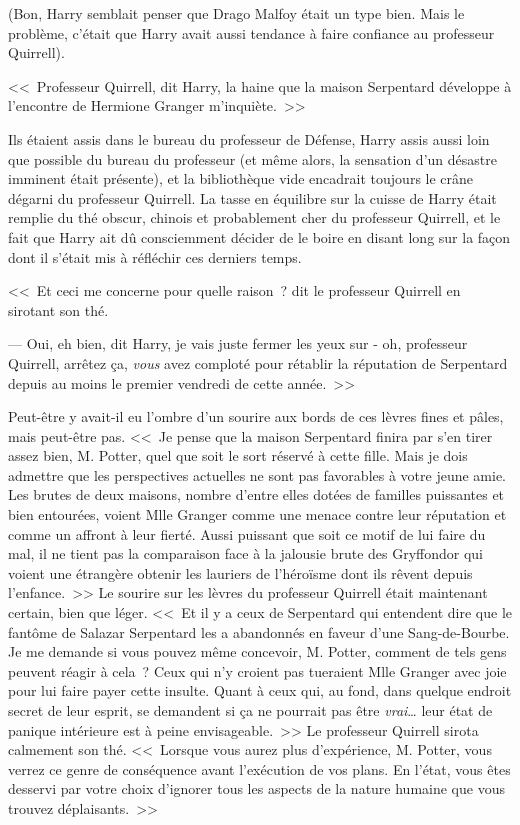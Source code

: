 (Bon, Harry semblait penser que Drago Malfoy était un type bien. Mais le problème, c'était que Harry avait aussi tendance à faire confiance au professeur Quirrell).

\later

<<~Professeur Quirrell, dit Harry, la haine que la maison Serpentard développe à l'encontre de Hermione Granger m'inquiète.~>>

Ils étaient assis dans le bureau du professeur de Défense, Harry assis aussi loin que possible du bureau du professeur (et même alors, la sensation d'un désastre imminent était présente), et la bibliothèque vide encadrait toujours le crâne dégarni du professeur Quirrell. La tasse en équilibre sur la cuisse de Harry était remplie du thé obscur, chinois et probablement cher du professeur Quirrell, et le fait que Harry ait dû consciemment décider de le boire en disant long sur la façon dont il s'était mis à réfléchir ces derniers temps.

<<~Et ceci me concerne pour quelle raison~? dit le professeur Quirrell en sirotant son thé.

--- Oui, eh bien, dit Harry, je vais juste fermer les yeux sur - oh, professeur Quirrell, arrêtez ça, \emph{vous} avez comploté pour rétablir la réputation de Serpentard depuis au moins le premier vendredi de cette année.~>>

Peut-être y avait-il eu l'ombre d'un sourire aux bords de ces lèvres fines et pâles, mais peut-être pas. <<~Je pense que la maison Serpentard finira par s'en tirer assez bien, M. Potter, quel que soit le sort réservé à cette fille. Mais je dois admettre que les perspectives actuelles ne sont pas favorables à votre jeune amie. Les brutes de deux maisons, nombre d'entre elles dotées de familles puissantes et bien entourées, voient Mlle Granger comme une menace contre leur réputation et comme un affront à leur fierté. Aussi puissant que soit ce motif de lui faire du mal, il ne tient pas la comparaison face à la jalousie brute des Gryffondor qui voient une étrangère obtenir les lauriers de l'héroïsme dont ils rêvent depuis l'enfance.~>> Le sourire sur les lèvres du professeur Quirrell était maintenant certain, bien que léger. <<~Et il y a ceux de Serpentard qui entendent dire que le fantôme de Salazar Serpentard les a abandonnés en faveur d'une Sang-de-Bourbe. Je me demande si vous pouvez même concevoir, M. Potter, comment de tels gens peuvent réagir à cela~? Ceux qui n'y croient pas tueraient Mlle Granger avec joie pour lui faire payer cette insulte. Quant à ceux qui, au fond, dans quelque endroit secret de leur esprit, se demandent si ça ne pourrait pas être \emph{vrai}… leur état de panique intérieure est à peine envisageable.~>> Le professeur Quirrell sirota calmement son thé. <<~Lorsque vous aurez plus d'expérience, M. Potter, vous verrez ce genre de conséquence avant l'exécution de vos plans. En l'état, vous êtes desservi par votre choix d'ignorer tous les aspects de la nature humaine que vous trouvez déplaisants.~>>

